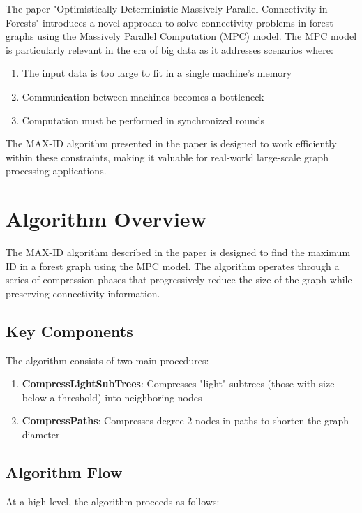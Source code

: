 \documentclass[11pt,a4paper]{article}
\begin{document}
The paper "Optimistically Deterministic Massively Parallel Connectivity in Forests" introduces a novel approach to solve connectivity problems in forest graphs using the Massively Parallel Computation (MPC) model. The MPC model is particularly relevant in the era of big data as it addresses scenarios where:
\begin{enumerate}
    \item The input data is too large to fit in a single machine's memory
    \item Communication between machines becomes a bottleneck
    \item Computation must be performed in synchronized rounds
\end{enumerate}

The MAX-ID algorithm presented in the paper is designed to work efficiently within these constraints, making it valuable for real-world large-scale graph processing applications.

\section{Algorithm Overview}

The MAX-ID algorithm described in the paper is designed to find the maximum ID in a forest graph using the MPC model. The algorithm operates through a series of compression phases that progressively reduce the size of the graph while preserving connectivity information.

\subsection{Key Components}

The algorithm consists of two main procedures:
\begin{enumerate}
    \item \textbf{CompressLightSubTrees}: Compresses "light" subtrees (those with size below a threshold) into neighboring nodes
    \item \textbf{CompressPaths}: Compresses degree-2 nodes in paths to shorten the graph diameter
\end{enumerate}

\subsection{Algorithm Flow}

At a high level, the algorithm proceeds as follows:
\end{document}

